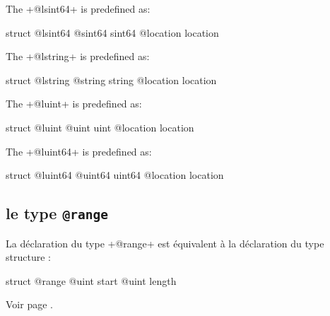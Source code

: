 
The \ggs+@lsint64+ is predefined as:
\begin{galgas}
struct @lsint64 {
  @sint64 sint64
  @location location
}
\end{galgas}








The \ggs+@lstring+ is predefined as:
\begin{galgas}
struct @lstring {
  @string string
  @location location
}
\end{galgas}








The \ggs+@luint+ is predefined as:
\begin{galgas}
struct @luint {
  @uint uint
  @location location
}
\end{galgas}






The \ggs+@luint64+ is predefined as:
\begin{galgas}
struct @luint64 {
  @uint64 uint64
  @location location
}
\end{galgas}


\subsection{le type \texttt{@range}}

La déclaration du type \ggs+@range+ est équivalent à la déclaration du type structure :
\begin{galgas}
struct @range {
  @uint start
  @uint length
}
\end{galgas}

Voir page \pageref{type:range}.
